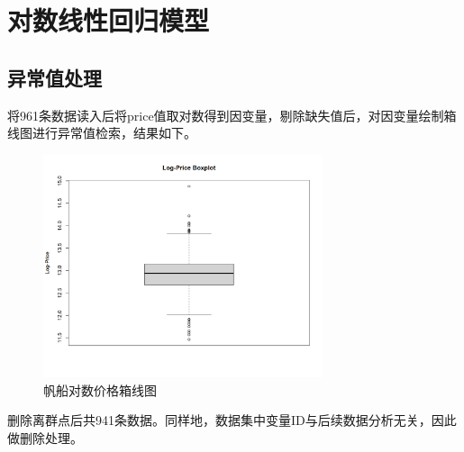 \documentclass[a4paper,12pt,onecolumn,oneside]{article}
\begin{document}
\section{对数线性回归模型}
\subsection{异常值处理}
将961条数据读入后将price值取对数得到因变量，剔除缺失值后，对因变量绘制箱线图进行异常值检索，结果如下。\par 
	\begin{figure}[H]
	\centering
	\includegraphics[width=0.73\textwidth]{res/box.png}
	\caption{帆船对数价格箱线图}
	\label{fig:box}
\end{figure}
删除离群点后共941条数据。同样地，数据集中变量ID与后续数据分析无关，因此做删除处理。
\end{document}
